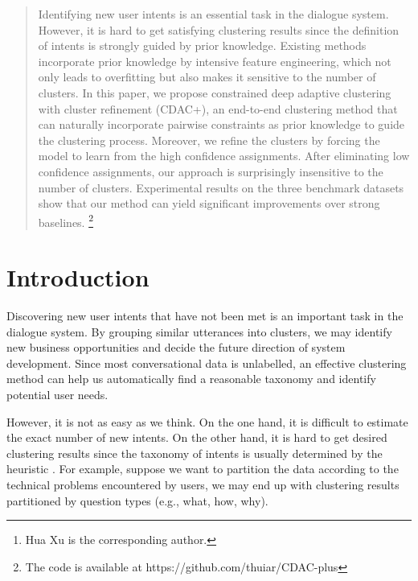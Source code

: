 \documentclass[letterpaper]{article} \usepackage{aaai20}  \usepackage{times}  \usepackage{helvet} \usepackage{courier}  \usepackage[hyphens]{url}  \usepackage{graphicx} \urlstyle{rm} \def\UrlFont{\rm}  \usepackage{graphicx}  \frenchspacing  \setlength{\pdfpagewidth}{8.5in}  \setlength{\pdfpageheight}{11in}
\author{
Ting-En Lin,\textsuperscript{\rm 1, 2}
Hua Xu,\textsuperscript{\rm 1,2}\thanks{Hua Xu is the corresponding author.}
Hanlei Zhang\textsuperscript{\rm 1,2,3}\\
\textsuperscript{\rm 1}State Key Laboratory of Intelligent Technology and Systems, \\ 
Department of Computer Science and Technology, Tsinghua University, Beijing 100084, China, \\
\textsuperscript{\rm 2} Beijing National Research Center for Information Science and Technology(BNRist), Beijing 100084, China\\
\textsuperscript{\rm 3} School of Computer and Information Technology, Beijing Jiaotong University, Beijing 100044, China \\
lte17@mails.tsinghua.edu.cn, xuhua@tsinghua.edu.cn, 16281181@bjtu.edu.cn
}
\begin{document}
\maketitle

\begin{abstract}
Identifying new user intents is an essential task in the dialogue system. However, it is hard to get satisfying clustering results since the definition of intents is strongly guided by prior knowledge. Existing methods incorporate prior knowledge by intensive feature engineering, which not only leads to overfitting but also makes it sensitive to the number of clusters.
In this paper, we propose constrained deep adaptive clustering with cluster refinement (CDAC+), an end-to-end clustering method that can naturally incorporate pairwise constraints as prior knowledge to guide the clustering process. 
Moreover, we refine the clusters by forcing the model to learn from the high confidence assignments. After eliminating low confidence assignments, our approach is surprisingly insensitive to the number of clusters. 
Experimental results on the three benchmark datasets show that our method can yield significant improvements over strong baselines. \footnote{The code is available at https://github.com/thuiar/CDAC-plus}
\end{abstract}

\section{Introduction}
Discovering new user intents that have not been met is an important task in the dialogue system. By grouping similar utterances into clusters, we may identify new business opportunities and decide the future direction of system development. Since most conversational data is unlabelled, an effective clustering method can help us automatically find a reasonable taxonomy and identify potential user needs. 

However, it is not as easy as we think. On the one hand, it is difficult to estimate the exact number of new intents. On the other hand, it is hard to get desired clustering results since the taxonomy of intents is usually determined by the heuristic \cite{lin-xu-2019-deep}. For example, suppose we want to partition the data according to the technical problems encountered by users, we may end up with clustering results partitioned by question types (e.g., what, how, why). 
 
\end{document}
